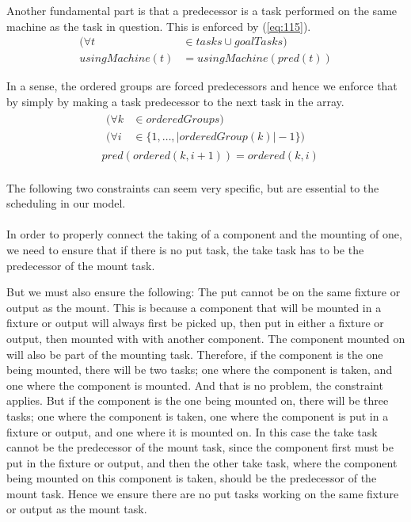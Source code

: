   \noindent  Another fundamental part is that a predecessor is a task performed on the same machine as the task in question. This is enforced by (\ref{eq:115}).
 \begin{equation}\label{eq:115}
 \begin{aligned}
 (\forall t &\in tasks \cup goalTasks) \\
 usingMachine(t) &= usingMachine(pred(t)) 
 \end{aligned}
 \end{equation}

  \noindent In a sense, the ordered groups are forced predecessors and hence we enforce that by simply by making a task predecessor to the next task in the array.
 \begin{equation}
 \begin{aligned}\label{eq:114}
 &\begin{aligned}
 (\forall k &\in orderedGroups) \\
 (\forall i &\in \{1 , \ldots , |orderedGroup(k)|-1\}) 
 \end{aligned}\\
 &pred(ordered(k, i + 1)) = ordered(k, i) \\
 \end{aligned}
 \end{equation}

  \noindent The following two constraints can seem very specific, but are essential to the scheduling in our model.
\\\\
 In order to properly connect the taking of a component and the mounting of one, we need to ensure that if there is no put task, the take task has to be the predecessor of the mount task. 
 
 But we must also ensure the following: The put cannot be on the same fixture or output as the mount. This is because a component that will be mounted in a fixture or output will always first be picked up, then put in either a fixture or output, then mounted with with another component. The component mounted on will also be part of the mounting task. Therefore, if the component is the one being mounted, there will be two tasks; one where the component is taken, and one where the component is mounted. And that is no problem, the constraint applies. But if the component is the one being mounted on, there will be three tasks; one where the component is taken, one where the component is put in a fixture or output, and one where it is mounted on. In this case the take task cannot be the predecessor of the mount task, since the component first must be put in the fixture or output, and then the other take task,  where the component being mounted on this component is taken, should be the predecessor of the mount task. Hence we ensure there are no put tasks working on the same fixture or output as the mount task.
 

